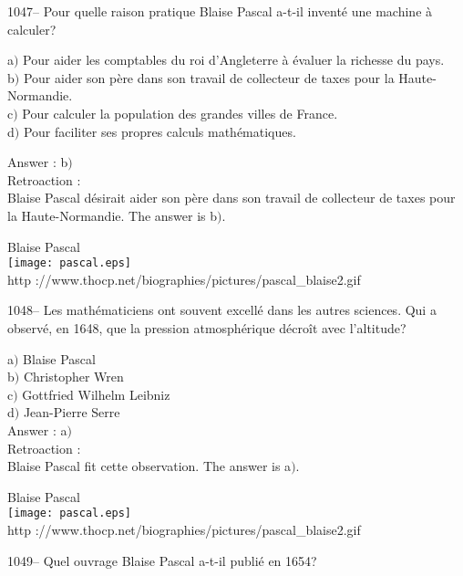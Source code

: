 ﻿\documentclass[letterpaper, 12pt]{article}
\begin{document}
1047-- Pour quelle raison pratique Blaise Pascal a-t-il invent\'e
une machine \`a calculer?

a$)$ Pour aider les comptables du roi d'Angleterre \`a \'evaluer la richesse
du pays.   \\
b$)$ Pour aider son p\`ere dans son travail de collecteur de taxes pour la
Haute-Normandie.  \\
c$)$ Pour calculer la population des grandes villes de France. \\
d$)$ Pour faciliter ses propres calculs math\'ematiques.

Answer : b$)$\\

Retroaction : \\
Blaise Pascal d\'esirait aider son p\`ere dans son travail de
collecteur de taxes pour la Haute-Normandie.
The answer is b$)$.\\

        \begin{center}
        Blaise Pascal\\
    \texttt{[image: pascal.eps]}\\
        {\footnotesize http
://www.thocp.net/biographies/pictures/pascal\_blaise2.gif}
    \end{center}

1048-- Les math\'ematiciens ont souvent excell\'e dans les autres
sciences. Qui a observ\'e, en 1648, que la pression atmosph\'erique
d\'ecro\^it avec l'altitude?

a$)$ Blaise Pascal \\
b$)$ Christopher Wren   \\
c$)$ Gottfried Wilhelm Leibniz  \\
d$)$ Jean-Pierre Serre \\

Answer : a$)$\\

Retroaction : \\
Blaise Pascal fit cette observation.
The answer is a$)$.\\

        \begin{center}
        Blaise Pascal\\
    \texttt{[image: pascal.eps]}\\
        {\footnotesize http
://www.thocp.net/biographies/pictures/pascal\_blaise2.gif}
    \end{center}

1049-- Quel ouvrage Blaise Pascal a-t-il publi\'e en 1654?
\end{document}
